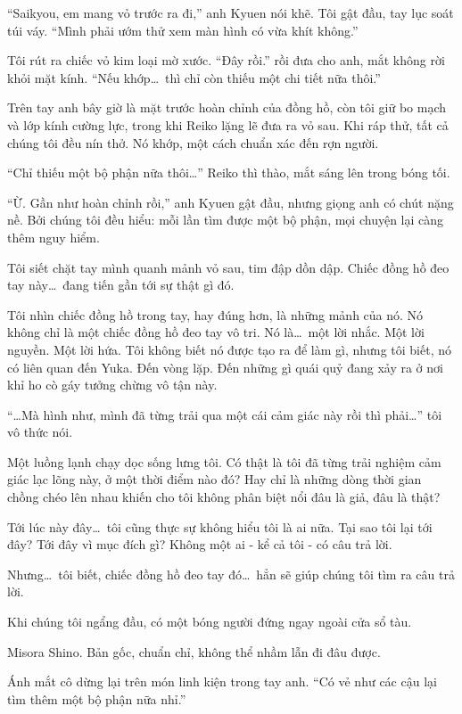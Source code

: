 \documentclass[../main.tex]{subfiles}
\begin{document}
``Saikyou, em mang vỏ trước ra đi,'' anh Kyuen nói khẽ. Tôi gật đầu, tay lục soát túi váy. ``Mình phải ướm thử xem màn hình có vừa khít không.''

Tôi rút ra chiếc vỏ kim loại mờ xước. ``Đây rồi.'' rồi đưa cho anh, mắt không rời khỏi mặt kính. ``Nếu khớp\dots\ thì chỉ còn thiếu một chi tiết nữa thôi.''

Trên tay anh bây giờ là mặt trước hoàn chỉnh của đồng hồ, còn tôi giữ bo mạch và lớp kính cường lực, trong khi Reiko lặng lẽ đưa ra vỏ sau. Khi ráp thử, tất cả chúng tôi đều nín thở. Nó khớp, một cách chuẩn xác đến rợn người.

``Chỉ thiếu một bộ phận nữa thôi\dots'' Reiko thì thào, mắt sáng lên trong bóng tối.

``Ừ. Gần như hoàn chỉnh rồi,'' anh Kyuen gật đầu, nhưng giọng anh có chút nặng nề. Bởi chúng tôi đều hiểu: mỗi lần tìm được một bộ phận, mọi chuyện lại càng thêm nguy hiểm.

Tôi siết chặt tay mình quanh mảnh vỏ sau, tim đập dồn dập. Chiếc đồng hồ đeo tay này\dots\ đang tiến gần tới sự thật gì đó.

Tôi nhìn chiếc đồng hồ trong tay, hay đúng hơn, là những mảnh của nó. Nó không chỉ là một chiếc đồng hồ đeo tay vô tri. Nó là\dots\ một lời nhắc. Một lời nguyền. Một lời hứa. Tôi không biết nó được tạo ra để làm gì, nhưng tôi biết, nó có liên quan đến Yuka. Đến vòng lặp. Đến những gì quái quỷ đang xảy ra ở nơi khỉ ho cò gáy tưởng chừng vô tận này.

``\dots Mà hình như, mình đã từng trải qua một cái cảm giác này rồi thì phải\dots'' tôi vô thức nói.

Một luồng lạnh chạy dọc sống lưng tôi. Có thật là tôi đã từng trải nghiệm cảm giác lạc lõng này, ở một thời điểm nào đó? Hay chỉ là những dòng thời gian chồng chéo lên nhau khiến cho tôi không phân biệt nổi đâu là giả, đâu là thật?

Tới lúc này đây\dots\ tôi cũng thực sự không hiểu tôi là ai nữa. Tại sao tôi lại tới đây? Tới đây vì mục đích gì? Không một ai - kể cả tôi - có câu trả lời.

Nhưng\dots\ tôi biết, chiếc đồng hồ đeo tay đó\dots\ hẳn sẽ giúp chúng tôi tìm ra câu trả lời.

Khi chúng tôi ngẩng đầu, có một bóng người đứng ngay ngoài cửa sổ tàu.

Misora Shino. Bản gốc, chuẩn chỉ, không thể nhầm lẫn đi đâu được.

Ánh mắt cô dừng lại trên món linh kiện trong tay anh. ``Có vẻ như các cậu lại tìm thêm một bộ phận nữa nhỉ.''
\end{document}
